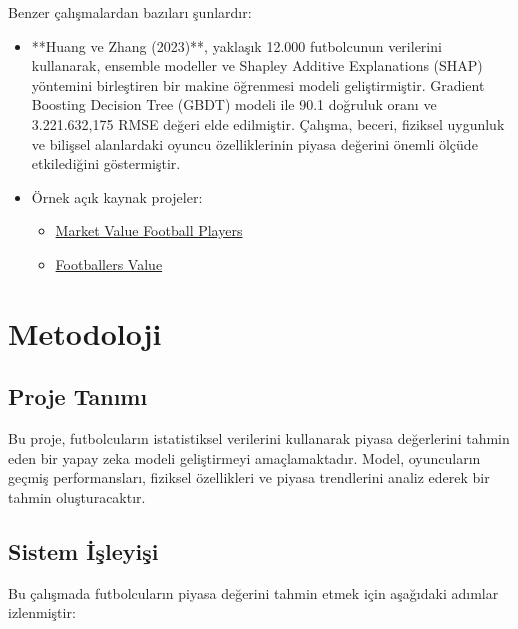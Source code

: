 \documentclass{article}
\begin{document}
Benzer çalışmalardan bazıları şunlardır:
\begin{itemize}
     \item **Huang ve Zhang (2023)**, yaklaşık 12.000 futbolcunun verilerini kullanarak, ensemble modeller ve Shapley Additive Explanations (SHAP) yöntemini birleştiren bir makine öğrenmesi modeli geliştirmiştir. Gradient Boosting Decision Tree (GBDT) modeli ile 90.1 doğruluk oranı ve 3.221.632,175 RMSE değeri elde edilmiştir. Çalışma, beceri, fiziksel uygunluk ve bilişsel alanlardaki oyuncu özelliklerinin piyasa değerini önemli ölçüde etkilediğini göstermiştir. 


    \item Örnek açık kaynak projeler:
    \begin{itemize}
        \item \href{https://github.com/gonzaferreiro/Market_value_football_players}{Market Value Football Players} \cite{github1}
        \item \href{https://github.com/mrvaita/footballers_value}{Footballers Value} \cite{github2}
    \end{itemize}
\end{itemize}


\section{Metodoloji}
\subsection{Proje Tanımı}
Bu proje, futbolcuların istatistiksel verilerini kullanarak piyasa değerlerini tahmin eden bir yapay zeka modeli geliştirmeyi amaçlamaktadır. Model, oyuncuların geçmiş performansları, fiziksel özellikleri ve piyasa trendlerini analiz ederek bir tahmin oluşturacaktır.


\subsection{Sistem İşleyişi}

Bu çalışmada futbolcuların piyasa değerini tahmin etmek için aşağıdaki adımlar izlenmiştir:
\end{document}
